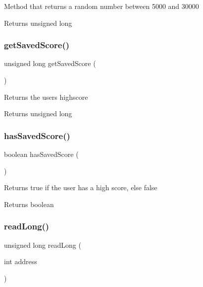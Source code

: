 Method that returns a random number between 5000 and 30000 \begin{DoxyReturn}{Returns}
unsigned long 
\end{DoxyReturn}
\mbox{\label{test_8ino_ae10d67159ad951c6d293550eba144547}} 
\subsubsection{\texorpdfstring{getSavedScore()}{getSavedScore()}}
{\footnotesize\ttfamily unsigned long get\+Saved\+Score (\begin{DoxyParamCaption}{ }\end{DoxyParamCaption})}

Returns the user\textquotesingle{}s highscore \begin{DoxyReturn}{Returns}
unsigned long 
\end{DoxyReturn}
\mbox{\label{test_8ino_a832bc26a7873ae480d28907b29880813}} 
\subsubsection{\texorpdfstring{hasSavedScore()}{hasSavedScore()}}
{\footnotesize\ttfamily boolean has\+Saved\+Score (\begin{DoxyParamCaption}{ }\end{DoxyParamCaption})}

Returns true if the user has a high score, else false \begin{DoxyReturn}{Returns}
boolean 
\end{DoxyReturn}
\mbox{\label{test_8ino_a9481ce48d8cc7194d54460345fdc4a1e}} 
\subsubsection{\texorpdfstring{readLong()}{readLong()}}
{\footnotesize\ttfamily unsigned long read\+Long (\begin{DoxyParamCaption}\item[{int}]{address }\end{DoxyParamCaption})}

